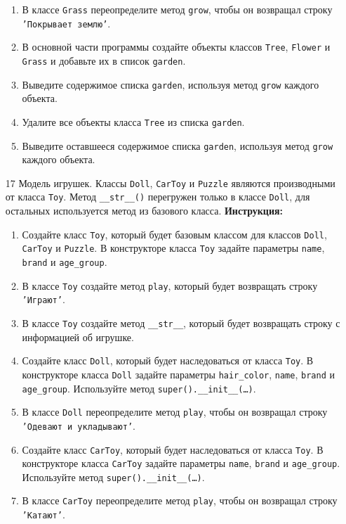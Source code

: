 \begin{enumerate}
\begin{enumerate}
    \item В классе \texttt{Grass} переопределите метод \texttt{grow}, чтобы он возвращал строку \texttt{'Покрывает землю'}.
    \item В основной части программы создайте объекты классов \texttt{Tree}, \texttt{Flower} и \texttt{Grass} и добавьте их в список \texttt{garden}.
    \item Выведите содержимое списка \texttt{garden}, используя метод \texttt{grow} каждого объекта.
    \item Удалите все объекты класса \texttt{Tree} из списка \texttt{garden}.
    \item Выведите оставшееся содержимое списка \texttt{garden}, используя метод \texttt{grow} каждого объекта.
\end{enumerate}
\item[17]
Модель игрушек. Классы \texttt{Doll}, \texttt{CarToy} и \texttt{Puzzle} являются производными от класса \texttt{Toy}. Метод \texttt{\_\_str\_\_()} перегружен только в классе \texttt{Doll}, для остальных используется метод из базового класса.
\textbf{Инструкция:}
\begin{enumerate}
    \item Создайте класс \texttt{Toy}, который будет базовым классом для классов \texttt{Doll}, \texttt{CarToy} и \texttt{Puzzle}. В конструкторе класса \texttt{Toy} задайте параметры \texttt{name}, \texttt{brand} и \texttt{age\_group}.
    \item В классе \texttt{Toy} создайте метод \texttt{play}, который будет возвращать строку \texttt{'Играют'}.
    \item В классе \texttt{Toy} создайте метод \texttt{\_\_str\_\_}, который будет возвращать строку с информацией об игрушке.
    \item Создайте класс \texttt{Doll}, который будет наследоваться от класса \texttt{Toy}. В конструкторе класса \texttt{Doll} задайте параметры \texttt{hair\_color}, \texttt{name}, \texttt{brand} и \texttt{age\_group}. Используйте метод \texttt{super().\_\_init\_\_(\ldots)}.
    \item В классе \texttt{Doll} переопределите метод \texttt{play}, чтобы он возвращал строку \texttt{'Одевают и укладывают'}.
    \item Создайте класс \texttt{CarToy}, который будет наследоваться от класса \texttt{Toy}. В конструкторе класса \texttt{CarToy} задайте параметры \texttt{name}, \texttt{brand} и \texttt{age\_group}. Используйте метод \texttt{super().\_\_init\_\_(\ldots)}.
    \item В классе \texttt{CarToy} переопределите метод \texttt{play}, чтобы он возвращал строку \texttt{'Катают'}.

\end{enumerate}
\end{enumerate}
